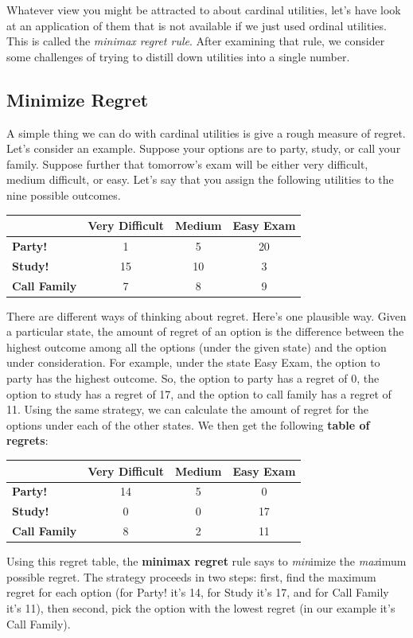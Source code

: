 \documentclass[]{tufte-book}
\begin{document}
Whatever view you might be attracted to about cardinal utilities, let's have look at an application of them that is not available if we just used ordinal utilities. This is called the \emph{minimax regret rule}. After examining that rule, we consider some challenges of trying to distill down utilities into a single number.

\hypertarget{minimize-regret}{%
\subsection{Minimize Regret}\label{minimize-regret}}

A simple thing we can do with cardinal utilities is give a rough measure of regret. Let's consider an example. Suppose your options are to party, study, or call your family. Suppose further that tomorrow's exam will be either very difficult, medium difficult, or easy. Let's say that you assign the following utilities to the nine possible outcomes.

\begin{longtable}[]{@{}lccc@{}}
\toprule
& Very Difficult & Medium & Easy Exam\tabularnewline
\midrule
\endhead
\textbf{Party!} & 1 & 5 & 20\tabularnewline
\textbf{Study!} & 15 & 10 & 3\tabularnewline
\textbf{Call Family} & 7 & 8 & 9\tabularnewline
\bottomrule
\end{longtable}

There are different ways of thinking about regret. Here's one plausible way. Given a particular state, the amount of regret of an option is the difference between the highest outcome among all the options (under the given state) and the option under consideration. For example, under the state Easy Exam, the option to party has the highest outcome. So, the option to party has a regret of 0, the option to study has a regret of 17, and the option to call family has a regret of 11. Using the same strategy, we can calculate the amount of regret for the options under each of the other states. We then get the following \textbf{table of regrets}:

\begin{longtable}[]{@{}lccc@{}}
\toprule
& Very Difficult & Medium & Easy Exam\tabularnewline
\midrule
\endhead
\textbf{Party!} & 14 & 5 & 0\tabularnewline
\textbf{Study!} & 0 & 0 & 17\tabularnewline
\textbf{Call Family} & 8 & 2 & 11\tabularnewline
\bottomrule
\end{longtable}

Using this regret table, the \textbf{minimax regret} rule says to \emph{min}imize the \emph{max}imum possible regret. The strategy proceeds in two steps: first, find the maximum regret for each option (for Party! it's 14, for Study it's 17, and for Call Family it's 11), then second, pick the option with the lowest regret (in our example it's Call Family).
\end{document}
